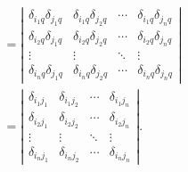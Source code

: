 \begin{align}
&=  \left|\begin{array}{cccc}
\delta_{i_1q}\delta_{j_1q} & \delta_{i_1q}\delta_{j_2q} & \cdots & \delta_{i_1q}\delta_{j_nq} \\ 
\delta_{i_2q}\delta_{j_1q} & \delta_{i_2q}\delta_{j_2q} & \cdots & \delta_{i_2q}\delta_{j_nq} \\ 
\vdots & \vdots & \ddots & \vdots \\ 
\delta_{i_nq}\delta_{j_1q} & \delta_{i_nq}\delta_{j_2q} & \cdots & \delta_{i_nq}\delta_{j_nq}
\end{array} \right| \\
&= \left|\begin{array}{cccc}
\delta_{i_1j_1} & \delta_{i_1j_2} & \cdots & \delta_{i_1j_n} \\ 
\delta_{i_2j_1} & \delta_{i_2j_2} & \cdots & \delta_{i_2j_n} \\ 
\vdots & \vdots & \ddots & \vdots \\ 
\delta_{i_nj_1} & \delta_{i_nj_2} & \cdots & \delta_{i_nj_n}
\end{array} \right| .
\end{align}
